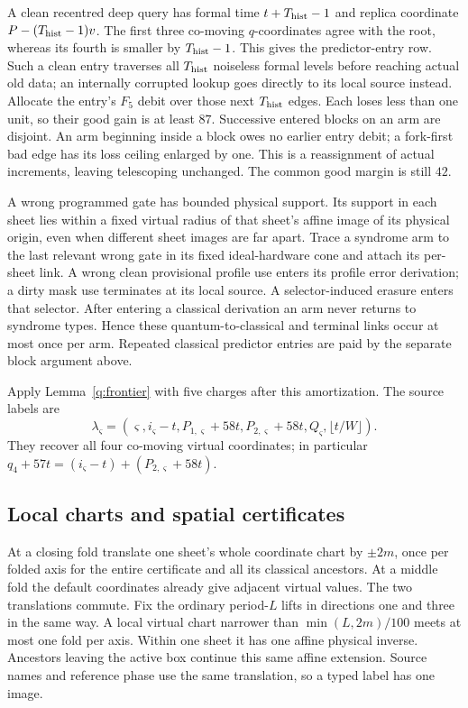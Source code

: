 A clean recentred deep query has formal time \(t+T_{\rm hist}-1\) and replica
coordinate \mbox{\(P-(T_{\rm hist}-1)v\)}. The first three co-moving \(q\)-coordinates
agree with the root, whereas its fourth is smaller by
\(T_{\rm hist}-1\). This gives the predictor-entry row. Such a clean entry
traverses all \(T_{\rm hist}\) noiseless formal levels before reaching actual
old data; an internally corrupted lookup goes directly to its local
source instead. Allocate the entry's \(F_5\) debit over those next
\(T_{\rm hist}\) edges. Each loses less than one unit, so their good gain is
at least \(87\). Successive entered blocks on an arm are disjoint.
An arm beginning inside a block owes no earlier entry debit; a
fork-first bad edge has its loss ceiling enlarged by one. This is
a reassignment of actual increments, leaving telescoping unchanged.
The common good margin is still \(42\).

A wrong programmed gate has bounded physical support. Its support
in each sheet lies within a fixed virtual radius of that sheet's
affine image of its physical origin, even when different sheet
images are far apart. Trace a syndrome arm to the last relevant
wrong gate in its fixed ideal-hardware cone and attach its per-sheet
link. A wrong clean provisional profile use enters its profile
error derivation; a dirty mask use terminates at its local source.
A selector-induced erasure enters that selector. After entering a
classical derivation an arm never returns to syndrome types. Hence
these quantum-to-classical and terminal links occur at most once
per arm. Repeated classical predictor entries are paid by the
separate block argument above.

Apply Lemma~\ref{q:frontier} with five charges after this amortization.
The source labels are
\begin{equation}\label{q:labels}
 \lambda_\varsigma=
 (\varsigma,i_\varsigma-t,P_{1,\varsigma}+58t,
      P_{2,\varsigma}+58t,Q_\varsigma,\lfloor t/W\rfloor).
\end{equation}
They recover all four co-moving virtual coordinates; in particular
\(q_4+57t=(i_\varsigma-t)+(P_{2,\varsigma}+58t)\).

\subsection{Local charts and spatial certificates}

At a closing fold translate one sheet's whole coordinate chart by
\(\pm2m\), once per folded axis for the entire certificate and all
its classical ancestors. At a middle fold the default coordinates
already give adjacent virtual values. The two translations commute.
Fix the ordinary period\nobreakdash-\(L\) lifts in directions one and three in
the same way. A local virtual chart narrower than
\(\min(L,2m)/100\) meets at most one fold per axis. Within one sheet
it has one affine physical inverse. Ancestors leaving the active
box continue this same affine extension. Source names and reference
phase use the same translation, so a typed label has one image.

